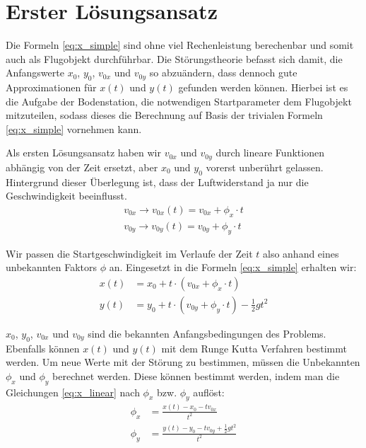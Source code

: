 \section{Erster Lösungsansatz
\label{perturbation:section:ersterloesungsansatz}}

Die Formeln \eqref{eq:x_simple} sind ohne viel Rechenleistung berechenbar und somit auch als Flugobjekt durchführbar. Die Störungstheorie befasst sich damit, die Anfangswerte $x_0$, $y_0$, $v_{0x}$ und $v_{0y}$ so abzuändern, dass dennoch gute Approximationen für $x(t)$ und $y(t)$ gefunden werden können. Hierbei ist es die Aufgabe der Bodenstation, die notwendigen Startparameter dem Flugobjekt mitzuteilen, sodass dieses die Berechnung auf Basis der trivialen Formeln \ref{eq:x_simple}  vornehmen kann.

Als ersten Lösungsansatz haben wir $v_{0x}$ und $v_{0y}$ durch lineare Funktionen abhängig von der Zeit ersetzt, aber $x_0$ und $y_0$ vorerst unberührt gelassen. Hintergrund dieser Überlegung ist, dass der Luftwiderstand ja nur die Geschwindigkeit beeinflusst.
\begin{equation*}
	\begin{aligned}
		v_{0x} \rightarrow v_{0x}(t) = v_{0x} + \phi_x \cdot t\\
		v_{0y} \rightarrow v_{0y}(t) = v_{0y} + \phi_y \cdot t
	\end{aligned}
\end{equation*}



Wir passen die Startgeschwindigkeit im Verlaufe der Zeit $t$ also anhand eines unbekannten Faktors $\phi$ an. Eingesetzt in die Formeln \eqref{eq:x_simple} erhalten wir:
\begin{equation}\label{eq:x_linear}
\begin{aligned}
    x(t) &= x_0 + t \cdot (v_{0x} + \phi_x \cdot t) \\
    y(t) &= y_0 + t \cdot (v_{0y} + \phi_y \cdot t) - \frac{1}{2}gt^2
\end{aligned}
\end{equation}

$x_0$, $y_0$, $v_{0x}$ und $v_{0y}$ sind die bekannten Anfangsbedingungen des Problems. Ebenfalls können $x(t)$ und $y(t)$ mit dem Runge Kutta Verfahren bestimmt werden. Um neue Werte mit der Störung zu bestimmen, müssen die Unbekannten $\phi_x$ und $\phi_y$ berechnet werden. Diese können bestimmt werden, indem man die Gleichungen \eqref{eq:x_linear} nach $\phi_x$ bzw. $\phi_y$ auflöst:
\begin{equation}
	\begin{aligned}
	\phi_x &= \frac{x(t) - x_0 - tv_{0x}}{t^2}\\
	\phi_y &= \frac{y(t) - y_0 - tv_{0y} + \frac{1}{2}gt^2}{t^2}
	\end{aligned}
\end{equation}

